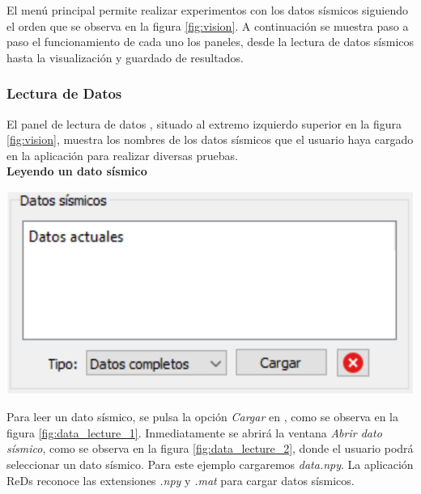 \documentclass[12pt,twoside,letter]{ol-softwaremanual}
\newcommand*\circled[1]{\tikz[baseline=(char.base)]{
            \node[shape=circle,draw,inner sep=2pt] (char) {#1};}}
\newenvironment{Figure}
  {\par\medskip\noindent\minipage{\linewidth}}
  {\endminipage\par\medskip}
\begin{document}
El menú principal permite realizar experimentos con los datos sísmicos siguiendo el orden que se observa en la figura \ref{fig:vision}. A continuación se muestra paso a paso el funcionamiento de cada uno los paneles, desde la lectura de datos sísmicos hasta la visualización y guardado de resultados.

\subsubsection{Lectura de Datos}

El panel de lectura de datos \circled{2}, situado al extremo izquierdo superior en la figura \ref{fig:vision}, muestra los nombres de los datos sísmicos que el usuario haya cargado en la aplicación para realizar diversas pruebas.\\

\textbf{Leyendo un dato sísmico} \label{sec:data_lecture}

\begin{multicols}{2}
	
\begin{Figure}
	\centering
	\includegraphics[width=.9\linewidth]{data-lecture-1.pdf}
	\label{fig:data_lecture_1}
\end{Figure}

Para leer un dato sísmico, se pulsa la opción \emph{Cargar} en \circled{2}, como se observa en la figura \ref{fig:data_lecture_1}. Inmediatamente se abrirá la ventana \textit{Abrir dato sísmico}, como se observa en la figura \ref{fig:data_lecture_2}, donde el usuario podrá seleccionar un dato sísmico. Para este ejemplo cargaremos \emph{data.npy}.
La aplicación ReDs reconoce las extensiones \emph{.npy} y \emph{.mat} para cargar datos sísmicos.

\end{multicols}
\end{document}
